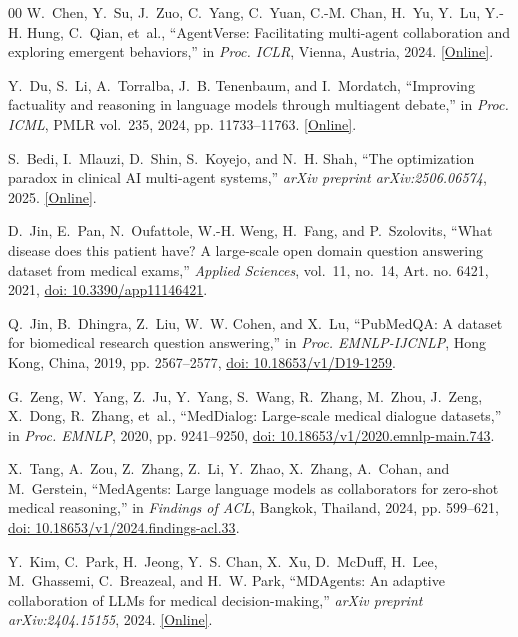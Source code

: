 \documentclass[conference]{IEEEtran}
\begin{document}
\begin{thebibliography}{00}
W.~Chen, Y.~Su, J.~Zuo, C.~Yang, C.~Yuan, C.-M. Chan, H.~Yu, Y.~Lu, Y.-H. Hung, C.~Qian, et~al., ``AgentVerse: Facilitating multi-agent collaboration and exploring emergent behaviors,'' in \emph{Proc. ICLR}, Vienna, Austria, 2024. \href{https://arxiv.org/abs/2308.10848}{[Online]}.

Y.~Du, S.~Li, A.~Torralba, J.~B. Tenenbaum, and I.~Mordatch, ``Improving factuality and reasoning in language models through multiagent debate,'' in \emph{Proc. ICML}, PMLR vol.~235, 2024, pp. 11733--11763. \href{https://arxiv.org/abs/2305.14325}{[Online]}.

S.~Bedi, I.~Mlauzi, D.~Shin, S.~Koyejo, and N.~H. Shah, ``The optimization paradox in clinical AI multi-agent systems,'' \emph{arXiv preprint arXiv:2506.06574}, 2025. \href{https://arxiv.org/abs/2506.06574}{[Online]}.

D.~Jin, E.~Pan, N.~Oufattole, W.-H. Weng, H.~Fang, and P.~Szolovits, ``What disease does this patient have? A large-scale open domain question answering dataset from medical exams,'' \emph{Applied Sciences}, vol.~11, no.~14, Art. no. 6421, 2021, \href{https://doi.org/10.3390/app11146421}{doi: 10.3390/app11146421}.

Q.~Jin, B.~Dhingra, Z.~Liu, W.~W. Cohen, and X.~Lu, ``PubMedQA: A dataset for biomedical research question answering,'' in \emph{Proc. EMNLP-IJCNLP}, Hong Kong, China, 2019, pp. 2567--2577, \href{https://doi.org/10.18653/v1/D19-1259}{doi: 10.18653/v1/D19-1259}.

G.~Zeng, W.~Yang, Z.~Ju, Y.~Yang, S.~Wang, R.~Zhang, M.~Zhou, J.~Zeng, X.~Dong, R.~Zhang, et~al., ``MedDialog: Large-scale medical dialogue datasets,'' in \emph{Proc. EMNLP}, 2020, pp. 9241--9250, \href{https://doi.org/10.18653/v1/2020.emnlp-main.743}{doi: 10.18653/v1/2020.emnlp-main.743}.

X.~Tang, A.~Zou, Z.~Zhang, Z.~Li, Y.~Zhao, X.~Zhang, A.~Cohan, and M.~Gerstein, ``MedAgents: Large language models as collaborators for zero-shot medical reasoning,'' in \emph{Findings of ACL}, Bangkok, Thailand, 2024, pp. 599--621, \href{https://doi.org/10.18653/v1/2024.findings-acl.33}{doi: 10.18653/v1/2024.findings-acl.33}.

Y.~Kim, C.~Park, H.~Jeong, Y.~S. Chan, X.~Xu, D.~McDuff, H.~Lee, M.~Ghassemi, C.~Breazeal, and H.~W. Park, ``MDAgents: An adaptive collaboration of LLMs for medical decision-making,'' \emph{arXiv preprint arXiv:2404.15155}, 2024. \href{https://arxiv.org/abs/2404.15155}{[Online]}.


\end{thebibliography}
\end{document}
